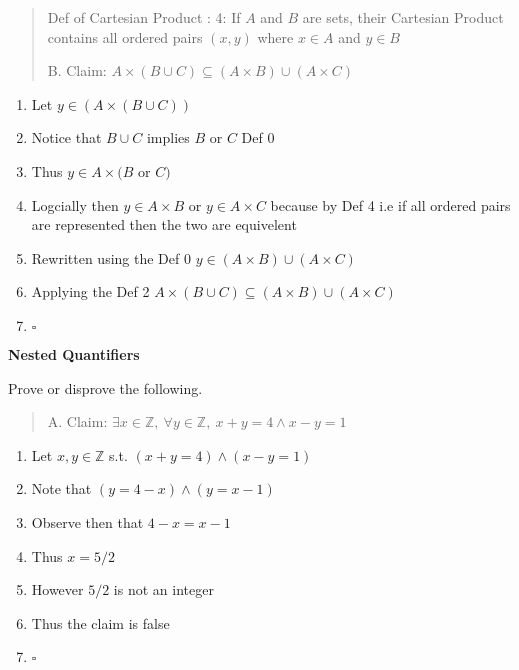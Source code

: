 \documentclass[12pt]{article}
\begin{document}
\begin{enumerate}
  \begin{quote}
  \item Def of Cartesian Product : 4: If $A$ and $B$ are sets, their Cartesian Product contains all ordered pairs $(x,y)$ where $x\in A$ and $y \in B$
  \item B. Claim: $A \times (B \cup C ) \subseteq (A \times B) \cup (A
    \times C) $
  \end{quote}

  \begin{enumerate}
  \item Let $y \in (A \times (B \cup C))$
  \item Notice that $B \cup C$ implies $B$ or $C$ Def 0
  \item Thus $y\in A \times(B$ or $C)$
  \item Logcially then $y \in A \times B$ or $y \in A \times C$ because by Def 4 i.e if all ordered pairs are represented then the two are equivelent
  \item Rewritten using the Def 0 $y \in (A \times B) \cup (A
    \times C)$
  \item Applying the Def 2 $A \times (B \cup C ) \subseteq
    (A \times B) \cup (A \times C) $
  \item $\square$

  \end{enumerate}

  \newpage
\item \textbf{Nested Quantifiers}

  Prove or disprove the following.
  \begin{quote}
  \item A. Claim: $\exists x \in \mathbb{Z}, \ \forall y \in
    \mathbb{Z},\ x+y=4 \wedge x-y=1$
  \end{quote}

  \begin{enumerate}
  \item Let $x,y \in \mathbb{Z}$ s.t. $(x+y=4) \wedge (x-y=1)$
  \item Note that $(y=4-x) \wedge (y=x-1)$
  \item Observe then that $4-x=x-1$
  \item Thus $x=5/2$
  \item However $5/2$ is not an integer
  \item Thus the claim is false
  \item $\square$
  \end{enumerate}


\end{enumerate}
\end{document}
